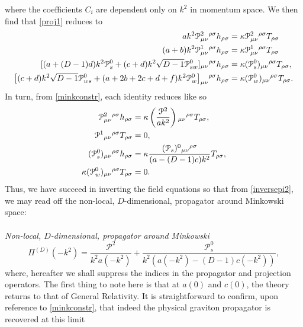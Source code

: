 where the coefficients $C_i$ are dependent only on $k^2$ in momentum space. We then find that \eqref{proj1} reduces to
\begin{align}
ak^2\mathcal{P}^2_{\mu\nu}{}{}^{\rho\sigma}h_{\rho\sigma}&=\kappa \mathcal{P} ^2_{\mu\nu}{}{}^{\rho\sigma} T_{\rho\sigma} \nonumber
\\ \nonumber
(a+b)k^2 \mathcal{P}^{1}_{\mu\nu}{}{}^{\rho\sigma}h_{\rho\sigma}&=\kappa\mathcal{P}^{1}_{\mu\nu}{}{}^{\rho\sigma}T_{\rho\sigma} \nonumber\\
[(a+(D-1)d)k^2\mathcal{P}_{s}^{0}+(c+d)k^2\sqrt{D-1}\mathcal{P}_{sw}^{0}]_{\mu\nu}{}{}^{\rho\sigma}h_{\rho\sigma}&=\kappa(\mathcal{P}_{s}^{0}){ }_{\mu\nu}{}{}^{\rho\sigma}T_{\rho\sigma},
\nonumber\\
\bigl[(c+d)k^2\sqrt{D-1}\mathcal{P}_{ws}^{0}+(a+2b+2c+d+f)k^2\mathcal{P}_{w}^{0}\bigr]_{\mu\nu}{}{}^{\rho\sigma}h_{\rho\sigma}&=\kappa(\mathcal{P}_{w}^{0}){ }_{\mu\nu}{}{}^{\rho\sigma}T_{\rho\sigma}.
\end{align}
In turn, from \eqref{minkconstr}, each identity reduces like so
\begin{align}
\mathcal{P}_{\mu\nu}^{2}{}{}^{\rho\sigma}h_{\rho\sigma}&=\kappa\left(\frac{\mathcal{P}^{2}}{ak^{2}}\right){}_{\mu\nu}{}{}^{\rho\sigma}T_{\rho\sigma},\nonumber
\\ \nonumber
\mathcal{P}^{1}{}_{\mu\nu}{}{}^{\rho\sigma}T_{\rho\sigma} &=0,\nonumber\\
(\mathcal{P}_{s}^{0}){}_{\mu\nu}{}{}^{\rho\sigma}h_{\rho\sigma}&=\kappa \frac{(\mathcal{P}_{s})^{0}{}_{\mu\nu}{}{}^{\rho\sigma}}{(a-(D-1)c)k^2}T_{\rho\sigma},
\nonumber \\
\kappa(\mathcal{P}_{w}^{0}){}_{\mu\nu}{}{}^{\rho\sigma}T_{\rho\sigma} &=0.
\end{align}
Thus, we have succeed in inverting the field equations so that from \eqref{inversepi2}, we may read off the non-local, $D$-dimensional, propagator around Minkowski space:
\\\\
\emph{Non-local, $D$-dimensional, propagator around Minkowski} 
\begin{equation}
\label{MinkPropD}
\Pi^{(D)}(-k^{2})=\frac{\mathcal{P}^{2}}{k^{2}a(-k^{2})}+\frac{\mathcal{P}_{s}^{0}}{k^{2}(a(-k^{2})-(D-1)c(-k^{2}))}
, \end{equation}
where, hereafter we shall suppress the indices in the propagator and projection operators. The first thing to note here is that at $a(0)$ and $c(0)$, the theory returns to that of General Relativity. It is straightforward to confirm, upon reference to \eqref{minkconstr}, that indeed the physical graviton propagator is recovered at this limit
